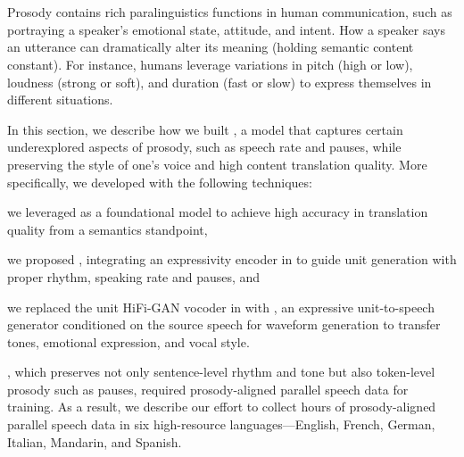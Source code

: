 \section{\seamlessexpressive}
\label{sec:expressivity}



Prosody contains rich paralinguistics functions in human communication, such as portraying a speaker's emotional state, attitude, and intent. How a speaker says an utterance can dramatically alter its meaning (holding semantic content constant). For instance, humans leverage variations in pitch (high or low), loudness (strong or soft), and duration (fast or slow) to express themselves in different situations.













In this section, we describe how we built \seamlessexpressive, a model that captures certain underexplored aspects of prosody, such as speech rate and pauses, while preserving the style of one's voice and high content translation quality.
More specifically, we developed \seamlessexpressive with the following techniques: 
\begin{enumerate*}[label={\arabic*})]
    \item we leveraged \mfourttwo as a foundational model to achieve high accuracy in translation quality from a semantics standpoint,
    \item we proposed \textbf{\prosodyunitytwo}, integrating an expressivity encoder in \mfourttwo to guide unit generation with proper rhythm, speaking rate and pauses, and
    \item we replaced the unit HiFi-GAN vocoder in \mfourttwo with \textbf{\ptv}, an expressive unit-to-speech generator conditioned on the source speech for waveform generation to transfer tones, emotional expression, and vocal style.
\end{enumerate*}


\seamlessexpressive, which preserves not only sentence-level rhythm and tone but also token-level prosody such as pauses, required prosody-aligned parallel speech data for \prosodyunitytwo training. As a result, we describe our effort to collect hours of prosody-aligned parallel speech data in six high-resource languages—English, French, German, Italian, Mandarin, and Spanish.



